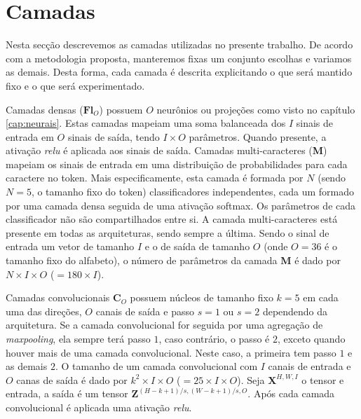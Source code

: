\section{Camadas}\label{sec:camadas}

Nesta secção descrevemos as camadas utilizadas no presente trabalho. De acordo com a metodologia proposta, manteremos fixas um conjunto escolhas e variamos as demais. Desta forma, cada camada é descrita explicitando o que será mantido fixo e o que será experimentado.

Camadas densas ($\mathbf{Fl}_{O}$) possuem $O$ neurônios ou projeções como visto no capítulo \ref{cap:neurais}. Estas camadas mapeiam uma soma balanceada dos $I$ sinais de entrada em $O$ sinais de saída, tendo $I \times O$ parâmetros. Quando presente, a ativação \textit{relu} é aplicada aos sinais de saída. Camadas multi-caracteres (\textbf{M}) mapeiam os sinais de entrada em uma distribuição de probabilidades para cada caractere no token. Mais especificamente, esta camada é formada por $N$ (sendo $N=5$, o tamanho fixo do token) classificadores independentes, cada um formado por uma camada densa seguida de uma ativação softmax. Os parâmetros de cada classificador não são compartilhados entre si. A camada multi-caracteres está presente em todas as arquiteturas, sendo sempre a última. Sendo o sinal de entrada um vetor de tamanho $I$ e o de saída de tamanho $O$ (onde $O=36$ é o tamanho fixo do alfabeto), o número de parâmetros da camada \textbf{M} é dado por $N \times I \times O$ ($ = 180 \times I$). 

Camadas convolucionais $\mathbf{C}_{O}$ possuem núcleos de tamanho fixo $k=5$ em cada uma das direções, $O$ canais de saída e passo $s=1$ ou $s=2$ dependendo da arquitetura. Se a camada convolucional for seguida por uma agregação de \textit{maxpooling}, ela sempre terá passo $1$, caso contrário, o passo é $2$, exceto quando houver mais de uma camada convolucional. Neste caso, a primeira tem passo $1$ e as demais $2$. O tamanho de um camada convolucional com $I$ canais de entrada e $O$ canas de saída é dado por $k^2 \times I \times O$ ($= 25 \times I \times O$). Seja $\mathbf{X}^{H, W, I}$ o tensor e entrada, a saída é um tensor $\mathbf{Z}^{\left(H - k + 1\right)/s, \left(W - k + 1\right)/s, O}$. Após cada camada convolucional é aplicada uma ativação \textit{relu}.

